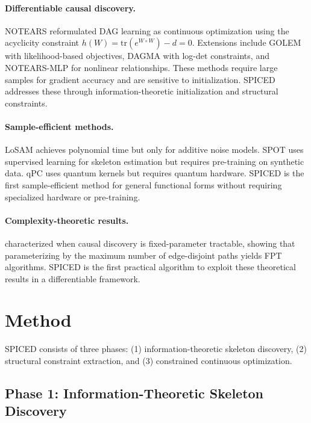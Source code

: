 \documentclass{article}
\begin{document}
\paragraph{Differentiable causal discovery.} NOTEARS \citep{zheng2018dags} reformulated DAG learning as continuous optimization using the acyclicity constraint $h(W) = \text{tr}(e^{W \circ W}) - d = 0$. Extensions include GOLEM \citep{ng2020role} with likelihood-based objectives, DAGMA \citep{bello2022dagma} with log-det constraints, and NOTEARS-MLP for nonlinear relationships. These methods require large samples for gradient accuracy and are sensitive to initialization. SPICED addresses these through information-theoretic initialization and structural constraints.

\paragraph{Sample-efficient methods.} LoSAM \citep{maasch2024local} achieves polynomial time but only for additive noise models. SPOT \citep{ma2024scalable} uses supervised learning for skeleton estimation but requires pre-training on synthetic data. qPC \citep{arai2025quantum} uses quantum kernels but requires quantum hardware. SPICED is the first sample-efficient method for general functional forms without requiring specialized hardware or pre-training.

\paragraph{Complexity-theoretic results.} \citet{ganian2024revisiting} characterized when causal discovery is fixed-parameter tractable, showing that parameterizing by the maximum number of edge-disjoint paths yields FPT algorithms. SPICED is the first practical algorithm to exploit these theoretical results in a differentiable framework.

\section{Method}

SPICED consists of three phases: (1) information-theoretic skeleton discovery, (2) structural constraint extraction, and (3) constrained continuous optimization.

\subsection{Phase 1: Information-Theoretic Skeleton Discovery}
\end{document}
